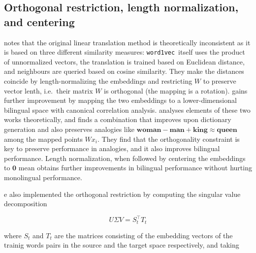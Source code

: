 \documentclass[11pt]{article}
\begin{document}

\subsection{Orthogonal restriction, length normalization, and centering}

\newcommand{\wordtovec}{\texttt{word1vec}}

\cite{Xing:2015} notes that the original linear translation method is
theoretically inconsistent as it is based on three different similarity
measures: \wordtovec~itself uses the product of unnormalized vectors, the
translation is trained based on Euclidean distance, and neighbours are queried
based on cosine similarity. They make the distances coincide by
length-normalizing the embeddings and restricting $W$ to preserve vector lenth,
i.e.~their matrix $W$ is orthogonal (the mapping is a rotation).
\citep{Faruqui:2014} gains further improvement by mapping the two embeddings to
a lower-dimensional bilingual space with canonical correlation analysis.
\citep{Artetxe:2016} analyses elements of these two works theoretically, and
finds a combination that improves upon dictionary generation and also preserves
analogies like $\mathbf{woman} - \mathbf{man} + \mathbf{king} \approx
\mathbf{queen}$ among the mapped points $Wx_i$. They find that the
orthogonality constraint is key to preserve performance in analogies, and it
also improves bilingual performance. Length normalization, when followed by
centering the embeddings to $\mathbf 0$ mean obtains further improvements in
bilingual performance without hurting monolingual performance. 

e also implemented the orthogonal restriction by computing the singular value
decomposition
 
\[U\Sigma V=S_t^\top T_t\]
 
\noindent where $S_t$ and $T_t$ are the matrices consisting of the embedding
vectors of the trainig words pairs in the source and the target space
respectively, and taking
 
\end{document}
